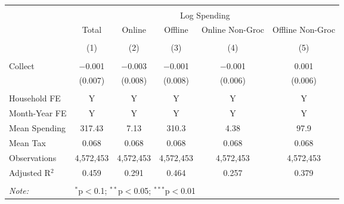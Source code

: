 
\begin{table}[!htbp] \centering 
  \caption{} 
  \label{} 
\begin{tabular}{@{\extracolsep{5pt}}lccccc} 
\\[-1.8ex]\hline 
\hline \\[-1.8ex] 
 & \multicolumn{5}{c}{Log Spending} \\ 
\cline{2-6} 
 & Total & Online & Offline & Online Non-Groc & Offline Non-Groc \\ 
\\[-1.8ex] & (1) & (2) & (3) & (4) & (5)\\ 
\hline \\[-1.8ex] 
 Collect & $-$0.001 & $-$0.003 & $-$0.001 & $-$0.001 & 0.001 \\ 
  & (0.007) & (0.008) & (0.008) & (0.006) & (0.006) \\ 
 \hline \\[-1.8ex] 
Household FE & Y & Y & Y & Y & Y \\ 
Month-Year FE & Y & Y & Y & Y & Y \\ 
Mean Spending & 317.43 & 7.13 & 310.3 & 4.38 & 97.9 \\ 
Mean Tax & 0.068 & 0.068 & 0.068 & 0.068 & 0.068 \\ 
Observations & 4,572,453 & 4,572,453 & 4,572,453 & 4,572,453 & 4,572,453 \\ 
Adjusted R$^{2}$ & 0.459 & 0.291 & 0.464 & 0.257 & 0.379 \\ 
\hline 
\hline \\[-1.8ex] 
\textit{Note:}  & \multicolumn{5}{l}{$^{*}$p$<$0.1; $^{**}$p$<$0.05; $^{***}$p$<$0.01} \\ 
\end{tabular} 
\end{table} 
